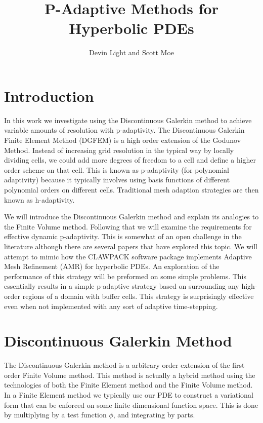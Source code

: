 \documentclass[10]{amsart}
\title[]{P-Adaptive Methods for Hyperbolic PDEs}
\author{Devin Light and Scott Moe}
\begin{document}
\maketitle

\section{Introduction}

In this work we investigate using the Discontinuous Galerkin method to achieve variable amounts of resolution
with p-adaptivity. The Discontinuous Galerkin Finite Element Method (DGFEM) is a high order
extension of the Godunov Method. Instead of increasing grid resolution in the typical way by locally dividing cells, 
we could add more
degrees of freedom to a cell and define a higher order scheme on that cell. This is known as p-adaptivity
(for polynomial adaptivity) because it typically involves using basis functions of different polynomial orders on different
cells. Traditional mesh adaption strategies are then known as h-adaptivity. 

We will introduce the Discontinuous Galerkin method and explain its analogies to the Finite Volume method. Following that
we will examine the requirements for effective dynamic p-adaptivity. This is somewhat of an open challenge in the literature
although there are several papers that have explored this topic. We will attempt to mimic how the 
CLAWPACK software package implements
Adaptive Mesh Refinement (AMR) for hyperbolic PDEs. An exploration of the performance of this strategy
will be preformed on some simple problems. This essentially
results in a simple p-adaptive strategy based on surrounding any high-order
regions of a domain with buffer cells. This strategy is surprisingly effective even when not implemented
with any sort of adaptive time-stepping.

\section{Discontinuous Galerkin Method}

The Discontinuous Galerkin method is a arbitrary order extension of the first order Finite Volume method.
This method is actually a hybrid method using the technologies of both the Finite Element method and the Finite
Volume method. In a Finite Element method we typically use our PDE to construct a variational
form that can be enforced on some finite dimensional function space. This is done by multiplying by a test function $\phi$,
and integrating by parts.
\end{document}
